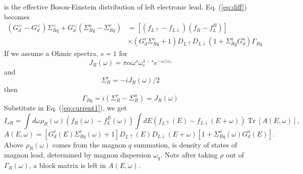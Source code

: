 \documentclass[11pt,a4paper]{article}
\begin{document}
is the effective Boson-Einstein distribution of left electronic lead. Eq. (\ref{eq:diff}) becomes
\begin{equation}
\begin{aligned}
\left(G_{d}^{>}-G_{d}^{<}\right) \Sigma_{R q}^{<}+G_{d}^{<}\left(\Sigma_{R q}^{a}-\Sigma_{R q}^{r}\right) &=\left[\left(f_{L \uparrow}-f_{L \downarrow}\right) (f_{R} -  f_{L}^{B}) \right] \\ & \times\left(G_{d}^{r} \Sigma_{R q}^{r}+1\right) D_{L \uparrow} D_{L \downarrow}\left(1+\Sigma_{R q}^{a} G_{d}^{a}\right) \Gamma_{R q} 
\end{aligned}
\end{equation}
If we assume a Ohmic spectra, $s=1$ for
\begin{equation}
J_{R}(\omega)=\pi \alpha \omega^{s} \omega_{c}^{1-s} e^{-\omega / \omega_{c}}
\end{equation}
and
\begin{equation}
\Sigma_{R}^{r}=-i J_{R}(\omega) / 2
\end{equation}
then
\begin{equation}
\Gamma_{Rq} = i(\Sigma_{R}^{r} - \Sigma_{R}^{a}) = J_{R}(\omega)
\end{equation}
Substitute in Eq. (\ref{eq:current1}), we get
\begin{equation}
I_{s R}=\int d \omega \rho_{R}(\omega)\left(f_{R}(\omega)-f_{L}^{B}(\omega)\right) \int d E\left(f_{L \uparrow}(E)-f_{L \downarrow}(E+\omega)\right) \operatorname{Tr}[A(E, \omega)],
\end{equation}
\begin{equation}
A(E, \omega)=\left[G_{d}^{r}(E) \Sigma_{R q}^{r}(\omega)+1\right] D_{L \uparrow}(E) D_{L \downarrow}(E+\omega)\left[1+\Sigma_{R q}^{a}(\omega) G_{d}^{a}(E)\right].
\end{equation}
Above $\rho_{R}(\omega)$ comes from the magnon $q$ summation, is density of states of magnon lead, determined by magnon dispersion $\omega_{q}$. Note after taking $\rho$ out of $\Gamma_{R}(\omega)$, a block matrix is left in $A(E,\omega)$.
\end{document}
